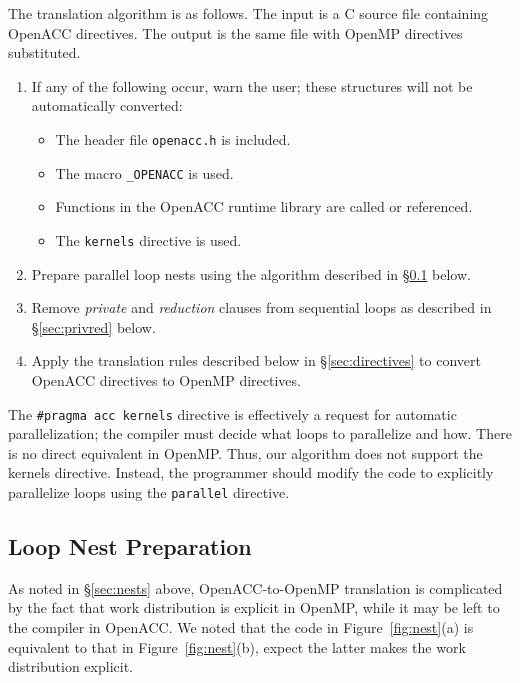 \documentclass{sig-alternate-05-2015}
\begin{document}
The translation algorithm is as follows.  The input is a C source file
containing OpenACC directives.  The output is the same file with OpenMP
directives substituted.
\begin{enumerate}
\item If any of the following occur, warn the user; these structures will
not be automatically converted:
\begin{itemize}
\item The header file \texttt{openacc.h} is included.
\item The macro \texttt{\_OPENACC} is used.
\item Functions in the OpenACC runtime library are called or referenced.
\item The \texttt{kernels} directive is used.
\end{itemize}
\item Prepare parallel loop nests using the algorithm described in
\S\ref{sec:loops} below.
\item Remove \emph{private} and \emph{reduction} clauses from sequential
loops as described in \S\ref{sec:privred} below.
\item Apply the translation rules described below in \S\ref{sec:directives} to
convert OpenACC directives to OpenMP directives.
\end{enumerate}

The \texttt{\#pragma acc kernels} directive is effectively a request for
automatic parallelization; the compiler must decide what loops to parallelize
and how.  There is no direct equivalent in OpenMP\@.  Thus, our algorithm does
not support the kernels directive.  Instead, the programmer should modify the
code to explicitly parallelize loops using the \texttt{parallel} directive.

\subsection{Loop Nest Preparation}
\label{sec:loops}

As noted in \S\ref{sec:nests} above, OpenACC-to-OpenMP translation is
complicated by the fact that work distribution is explicit in OpenMP, while it
may be left to the compiler in OpenACC\@.  We noted that the code in
Figure~\ref{fig:nest}(a) is equivalent to that in Figure~\ref{fig:nest}(b),
expect the latter makes the work distribution explicit.
\end{document}
